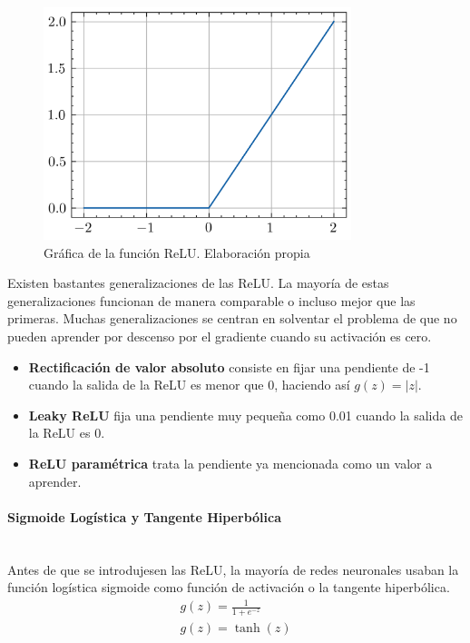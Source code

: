 \begin{figure}[h]
    \centering
    \includegraphics[width=0.8\textwidth]{figuras/relu.png}
    \caption{Gráfica de la función ReLU. Elaboración propia}
    \label{fig:relu}
\end{figure}

Existen bastantes generalizaciones de las ReLU. La mayoría de estas generalizaciones funcionan de manera comparable o incluso mejor que las primeras. Muchas generalizaciones se centran en solventar el problema de que no pueden aprender por descenso por el gradiente cuando su activación es cero.
\begin{itemize}
    \item \textbf{Rectificación de valor absoluto} consiste en fijar una pendiente de -1 cuando la salida de la ReLU es menor que 0, haciendo así $g(z)=|z|$.
    \item \textbf{Leaky ReLU} fija una pendiente muy pequeña como 0.01 cuando la salida de la ReLU es 0.
    \item \textbf{ReLU paramétrica} trata la pendiente ya mencionada como un valor a aprender.
\end{itemize}

\paragraph{Sigmoide Logística y Tangente Hiperbólica}\mbox{}\\
Antes de que se introdujesen las ReLU, la mayoría de redes neuronales usaban la función logística sigmoide como función de activación o la tangente hiperbólica.
\begin{gather}
    g(z) = \frac{1}{1 + e^{-z}} \\
    g(z) = \tanh{(z)}
\end{gather}

